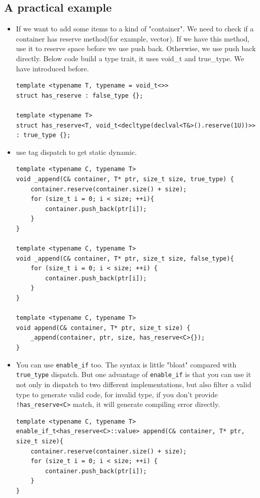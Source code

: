 \documentclass[a4paper,11pt,twoside]{book}
\begin{document}
\subsection{A practical example}
\begin{itemize}
    \item If we want to add some items to a kind of "container". We need to check if a container has reserve method(for example, vector). If we have this method, use it to reserve space before we use push back. Otherwise, we use push back directly. Below code build a type trait, it uses void\_t and true\_type. We have introduced before. 
\begin{lstlisting}
template <typename T, typename = void_t<>>
struct has_reserve : false_type {};
   
template <typename T>
struct has_reserve<T, void_t<decltype(declval<T&>().reserve(1U))>> : true_type {};   
\end{lstlisting}

    \item use tag dispatch to get static dynamic.
\begin{lstlisting}
template <typename C, typename T>
void _append(C& container, T* ptr, size_t size, true_type) {
    container.reserve(container.size() + size);
    for (size_t i = 0; i < size; ++i){ 
        container.push_back(ptr[i]);
    }
}

template <typename C, typename T>
void _append(C& container, T* ptr, size_t size, false_type){
    for (size_t i = 0; i < size; ++i) {
        container.push_back(ptr[i]);
    }
}

template <typename C, typename T>
void append(C& container, T* ptr, size_t size) { 
    _append(container, ptr, size, has_reserve<C>{}); 
}
\end{lstlisting}

    \item You can use \texttt{enable\_if} too. The syntax is little "bloat" compared with \texttt{true\_type} dispatch. But one advantage of \texttt{enable\_if} is that you can use it not only in dispatch to two different implementations, but also filter a valid type to generate valid code, for invalid type, if you don't provide \texttt{!has\_reserve<C>} match, it will generate compiling error directly.
\begin{lstlisting}
template <typename C, typename T>
enable_if_t<has_reserve<C>::value> append(C& container, T* ptr, size_t size){
    container.reserve(container.size() + size);
    for (size_t i = 0; i < size; ++i) {
    	container.push_back(ptr[i]);
    }
}


\end{lstlisting}
\end{itemize}
\end{document}

